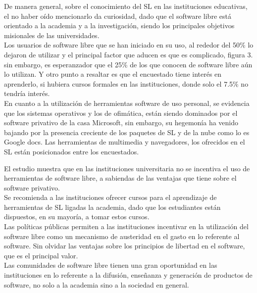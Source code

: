 \begin{multicols}{2}

De manera general, sobre el conocimiento del SL en las instituciones educativas, el no haber oído mencionarlo da curiosidad, dado que el software libre está orientado a la academia y a la investigación, siendo los principales objetivos misionales de las universidades.\\

Los usuarios de software libre que se han iniciado en su uso, al rededor del 50\% lo dejaron de utilizar y el principal factor que aducen es que es complicado, figura 3. sin embargo, es esperanzador que el 25\% de los que conocen de software libre aún lo utilizan. Y otro punto a resaltar es que el encuestado tiene interés en aprenderlo, si hubiera cursos formales en las instituciones, donde solo el 7.5\% no tendría interés.\\

En cuanto a la utilización de herramientas software de uso personal, se evidencia que los sistemas operativos y los de ofimática, están siendo dominados por el software privativo de la casa Microsoft, sin embargo, su hegemonía ha venido bajando por la presencia creciente de los paquetes de SL y de la nube como lo es Google docs. Las herramientas de multimedia y navegadores, los ofrecidos en el SL están posicionados entre los encuestados.\\


El estudio muestra que en las instituciones universitaria no se incentiva el uso de herramientas de software libre, a sabiendas de las ventajas que tiene sobre el software privativo.\\

Se recomienda a las instituciones ofrecer cursos para el aprendizaje de herramientas de SL ligadas la academia, dado que los estudiantes están dispuestos, en su mayoría, a tomar estos cursos.\\

 Las políticas públicas permiten a las instituciones incentivar en la utilización del software libre como un mecanismo de austeridad en el gasto en lo referente al software. Sin olvidar las ventajas sobre los principios de libertad en el software, que es el principal valor.\\
 
Las comunidades de software libre tienen una gran oportunidad en las instituciones en lo referente a la difusión, enseñanza y generación de productos de software, no solo a la academia sino a la sociedad en general.
\\


\end{multicols}
